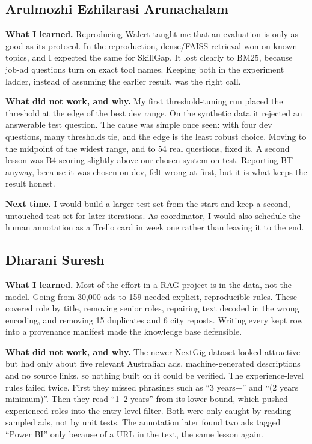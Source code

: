 
\subsection{Arulmozhi Ezhilarasi Arunachalam}
\textbf{What I learned.} Reproducing Walert taught me that an evaluation is only as good as its protocol. In the reproduction, dense/FAISS retrieval won on known topics, and I expected the same for SkillGap. It lost clearly to BM25, because job-ad questions turn on exact tool names. Keeping both in the experiment ladder, instead of assuming the earlier result, was the right call.

\textbf{What did not work, and why.} My first threshold-tuning run placed the threshold at the edge of the best dev range. On the synthetic data it rejected an answerable test question. The cause was simple once seen: with four dev questions, many thresholds tie, and the edge is the least robust choice. Moving to the midpoint of the widest range, and to 54 real questions, fixed it. A second lesson was B4 scoring slightly above our chosen system on test. Reporting BT anyway, because it was chosen on dev, felt wrong at first, but it is what keeps the result honest.

\textbf{Next time.} I would build a larger test set from the start and keep a second, untouched test set for later iterations. As coordinator, I would also schedule the human annotation as a Trello card in week one rather than leaving it to the end.

\subsection{Dharani Suresh}
\textbf{What I learned.} Most of the effort in a RAG project is in the data, not the model. Going from 30,000 ads to 159 needed explicit, reproducible rules. These covered role by title, removing senior roles, repairing text decoded in the wrong encoding, and removing 15 duplicates and 6 city reposts. Writing every kept row into a provenance manifest made the knowledge base defensible.

\textbf{What did not work, and why.} The newer NextGig dataset looked attractive but had only about five relevant Australian ads, machine-generated descriptions and no source links, so nothing built on it could be verified. The experience-level rules failed twice. First they missed phrasings such as ``3 years+'' and ``(2 years minimum)''. Then they read ``1--2 years'' from its lower bound, which pushed experienced roles into the entry-level filter. Both were only caught by reading sampled ads, not by unit tests. The annotation later found two ads tagged ``Power BI'' only because of a URL in the text, the same lesson again.

